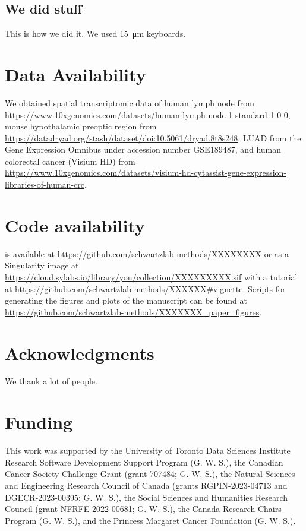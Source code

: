 \begin{refsegment}
\subsection*{We did stuff}

This is how we did it. We used \SI{15}{\micro\meter} keyboards.

\section*{Data Availability}

We obtained spatial transcriptomic data of human lymph node from
\url{https://www.10xgenomics.com/datasets/human-lymph-node-1-standard-1-0-0},
mouse hypothalamic preoptic region from
\url{https://datadryad.org/stash/dataset/doi:10.5061/dryad.8t8s248}, LUAD from
the Gene Expression Omnibus under accession number GSE189487, and human
colorectal cancer (Visium HD) from
\url{https://www.10xgenomics.com/datasets/visium-hd-cytassist-gene-expression-libraries-of-human-crc}.

\section*{Code availability}

 is available at
\url{https://github.com/schwartzlab-methods/XXXXXXXX} or as a Singularity image
at \url{https://cloud.sylabs.io/library/you/collection/XXXXXXXXX.sif} with a
tutorial at \url{https://github.com/schwartzlab-methods/XXXXXX#vignette}.
Scripts for generating the figures and plots of the manuscript can be found at
\url{https://github.com/schwartzlab-methods/XXXXXXX_paper_figures}.

\section*{Acknowledgments}

We thank a lot of people.

\section*{Funding}

This work was supported by the University of Toronto Data Sciences Institute
Research Software Development Support Program (G. W. S.), the Canadian Cancer
Society Challenge Grant (grant 707484; G. W. S.), the Natural Sciences and
Engineering Research Council of Canada (grants RGPIN-2023-04713 and
DGECR-2023-00395; G. W. S.), the Social Sciences and Humanities Research Council
(grant NFRFE-2022-00681; G. W. S.), the Canada Research Chairs Program (G. W.
S.), and the Princess Margaret Cancer Foundation (G. W. S.).


\end{refsegment}
